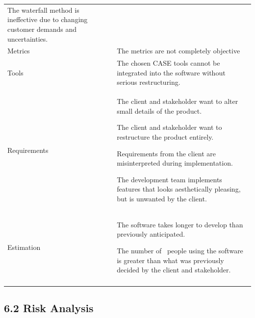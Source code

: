 \documentclass[]{article}
\begin{document}
\begin{longtable}[c]{@{}ll@{}}
\begin{minipage}[t]{0.47\columnwidth}
The waterfall method is ineffective due to changing customer demands and
uncertainties.
\end{minipage}
\\\addlinespace
\begin{minipage}[t]{0.47\columnwidth}\raggedright
Metrics
\end{minipage} & \begin{minipage}[t]{0.47\columnwidth}\raggedright
The metrics are not completely objective
\end{minipage}
\\\addlinespace
\begin{minipage}[t]{0.47\columnwidth}\raggedright
Tools
\end{minipage} & \begin{minipage}[t]{0.47\columnwidth}\raggedright
The chosen CASE tools cannot be integrated into the software without
serious restructuring.
\end{minipage}
\\\addlinespace
\begin{minipage}[t]{0.47\columnwidth}\raggedright
Requirements
\end{minipage} & \begin{minipage}[t]{0.47\columnwidth}\raggedright
The client and stakeholder want to alter small details of the product.

The client and stakeholder want to restructure the product entirely.

Requirements from the client are misinterpreted during implementation.

The development team implements features that looks aesthetically
pleasing, but is unwanted by the client.
\end{minipage}
\\\addlinespace
\begin{minipage}[t]{0.47\columnwidth}\raggedright
Estimation
\end{minipage} & \begin{minipage}[t]{0.47\columnwidth}\raggedright
The software takes longer to develop than previously anticipated.

The number of ~people using the software is greater than what was
previously decided by the client and stakeholder.
\end{minipage}
\\\addlinespace
\bottomrule
\end{longtable}

\subsection{6.2 Risk Analysis}\label{risk-analysis}
\end{document}
